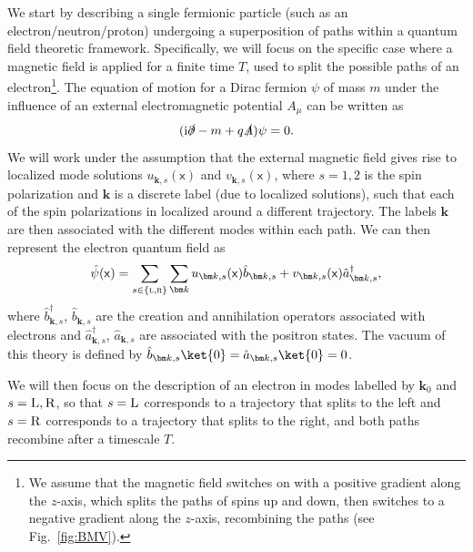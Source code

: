 \documentclass[letterpaper,12pt,titlepage,oneside,final]{book}
\newcommand{\mf}{\mathsf}%
\newcommand{\ii}{\mathrm{i}}
\newcommand{\tc}[1]{\textsc{#1}}
\begin{document}
We start by describing a single fermionic particle (such as an electron/neutron/proton) undergoing a superposition of paths within a quantum field theoretic framework. Specifically, we will focus on the specific case where a magnetic field is applied for a finite time $T$, used to split the possible paths of an electron\footnote{We assume that the magnetic field switches on with a positive gradient along the $z$-axis, which splits the paths of spins up and down, then switches to a negative gradient along the $z$-axis, recombining the paths (see Fig.~\ref{fig:BMV}).}. The equation of motion for a Dirac fermion $\psi$ of mass $m$ under the influence of an external electromagnetic potential $A_\mu$ can be written as
\begin{equation}
    (\ii \slashed{\partial} - m + q \slashed{A})\psi = 0.
\end{equation}
We will work under the assumption that the external magnetic field gives rise to localized mode solutions $u_{\bm k,s}(\mf x)$ and $v_{\bm k,s}(\mf x)$, where $s = 1,2$ is the spin polarization and $\bm k$ is a discrete label (due to localized solutions), such that each of the spin polarizations in localized around a different trajectory. The labels $\bm k$ are then associated with the different modes within each path. We can then represent the electron quantum field as
\begin{equation}
    \hat{\psi}(\mf x) = \sum_{s\in\{\tc{l},\tc{r}\}} \sum_{\bm k} u_{\bm k,s}(\mf x) \hat{b}_{\bm k,s} + v_{\bm k,s}(\mf x) \hat{a}_{\bm k,s}^\dagger,
\end{equation}
where $\hat{b}_{\bm k,s}^\dagger$, $\hat{b}_{\bm k,s}$ are the creation and annihilation operators associated with electrons and $\hat{a}_{\bm k,s}^\dagger$, $\hat{a}_{\bm k,s}$ are associated with the positron states. The vacuum of this theory is defined by $\hat{b}_{\bm k,s}\ket{0} =\hat{a}_{\bm k,s}\ket{0} = 0$.

We will then focus on the description of an electron in modes labelled by $\bm k_0$ and $s=\tc{L},\tc{R}$, so that $s=\tc{L}$ corresponds to a trajectory that splits to the left and $s=\tc{R}$ corresponds to a trajectory that splits to the right, and both paths recombine after a timescale $T$. %
\end{document}
